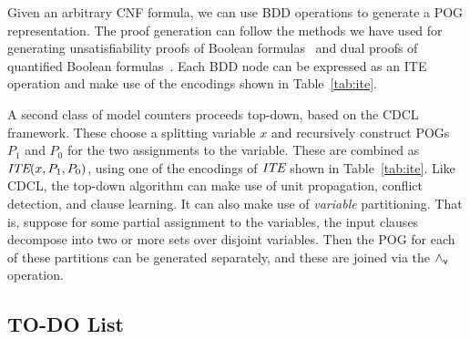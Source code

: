 \documentclass{llncs}
\newcommand{\pand}{\mathbin{\land_{\sf v}}}
\newcommand{\obar}[1]{\overline{#1}}
\newcommand{\ite}{\mbox{\it ITE}}
\begin{document}
Given an arbitrary CNF formula, we can use BDD operations to generate
a POG representation.  The proof generation can follow the
methods we have used for generating unsatisfiability proofs of Boolean
formulas~\cite{bryant:tacas:2021} and dual proofs of quantified
Boolean formulas~\cite{bryant:cade:2021}.
Each BDD node can be expressed as an ITE operation and
make use of the encodings shown in Table~\ref{tab:ite}.

A second class of model counters proceeds top-down, based on the CDCL
framework.  These choose a splitting variable $x$ and recursively
construct POGs $P_1$ and $P_0$ for the two assignments to the
variable.  These are combined as $\ite(x, P_1, P_0)$, using one of the
encodings of $\ite$ shown in Table~\ref{tab:ite}.  Like CDCL, the
top-down algorithm can make use of unit propagation, conflict
detection, and clause learning.  It can also make use of {\em
  variable} partitioning.  That is, suppose for some partial
assignment to the variables, the input clauses decompose into two or
more sets over disjoint variables.  Then the POG for each of these
partitions can be generated separately, and these are joined via the $\pand$
operation.



\subsection{TO-DO List}
\end{document}
